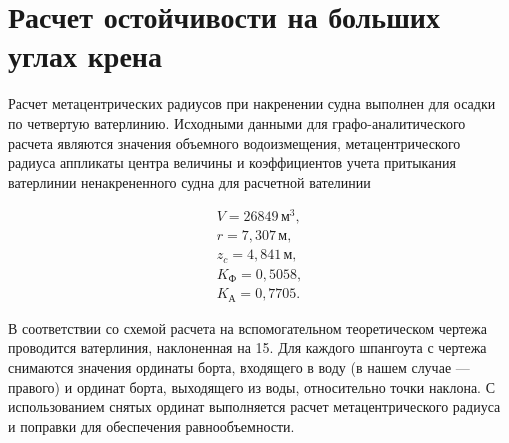 \newpage

\section{Расчет остойчивости на больших углах крена}

Расчет метацентрических радиусов при накренении судна выполнен для осадки по четвертую ватерлинию.
Исходными данными для графо-аналитического расчета являются значения объемного водоизмещения, метацентрического радиуса аппликаты центра величины и коэффициентов учета притыкания ватерлинии ненакрененного судна для расчетной вателинии

\begin{equation*}
    \begin{split}
        V = 26849\,\text{м}^3,\\
        r = 7{,}307\,\text{м}, \\
        z_c = 4{,}841\,\text{м}, \\
        K_{\text{Ф}} = 0{,}5058, \\
        K_{\text{А}} = 0{,}7705.
    \end{split}
\end{equation*}

В соответствии со схемой расчета на вспомогательном теоретическом чертежа проводится ватерлиния, наклоненная на 15\textdegree.
Для каждого шпангоута с чертежа снимаются значения ординаты борта, входящего в воду (в нашем случае --- правого) и ординат борта, выходящего из воды, относительно точки наклона.
С использованием снятых ординат выполняется расчет метацентрического радиуса и поправки для обеспечения равнообъемности.

